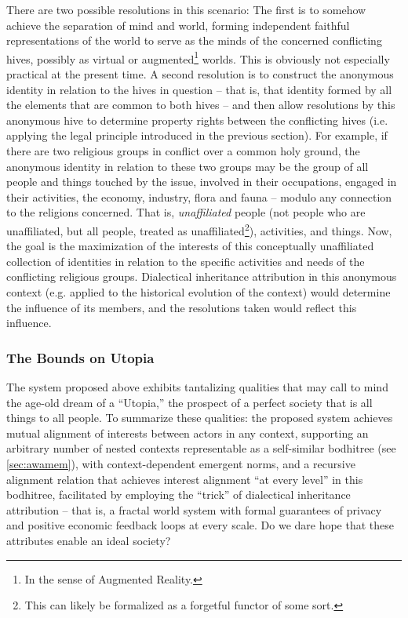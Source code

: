 \documentclass[pra,twocolumn,groupedaddress,10pt]{revtex4}
\theoremstyle{definition}
\begin{document}
There are two possible resolutions in this scenario: The first is to somehow achieve the separation of mind and world, forming independent faithful representations of the world to serve as the minds of the concerned conflicting hives, possibly as virtual or augmented\footnote{In the sense of Augmented Reality.} worlds. This is obviously not especially practical at the present time. A second resolution is to construct the anonymous identity in relation to the hives in question -- that is, that identity formed by all the elements that are common to both hives -- and then allow resolutions by this anonymous hive to determine property rights between the conflicting hives (i.e. applying the legal principle introduced in the previous section). For example, if there are two religious groups in conflict over a common holy ground, the anonymous identity in relation to these two groups may be the group of all people and things touched by the issue, involved in their occupations, engaged in their activities, the economy, industry, flora and fauna -- modulo any connection to the religions concerned. That is, \textit{unaffiliated} people (not people who are unaffiliated, but all people, treated as unaffiliated\footnote{This can likely be formalized as a forgetful functor of some sort.}), activities, and things. Now, the goal is the maximization of the interests of this conceptually unaffiliated collection of identities in relation to the specific activities and needs of the conflicting religious groups. Dialectical inheritance attribution in this anonymous context (e.g. applied to the historical evolution of the context) would determine the influence of its members, and the resolutions taken would reflect this influence.


\subsubsection{The Bounds on Utopia}

The system proposed above exhibits tantalizing qualities that may call to mind the age-old dream of a ``Utopia,'' the prospect of a perfect society that is all things to all people. To summarize these qualities: the proposed system achieves mutual alignment of interests between actors in any context, supporting an arbitrary number of nested contexts representable as a self-similar bodhitree (see \autoref{sec:awamem}), with context-dependent emergent norms, and a recursive alignment relation that achieves interest alignment ``at every level'' in this bodhitree, facilitated by employing the ``trick'' of dialectical inheritance attribution -- that is, a fractal world system with formal guarantees of privacy and positive economic feedback loops at every scale. Do we dare hope that these attributes enable an ideal society?
\end{document}
